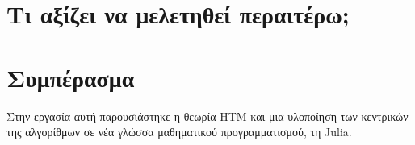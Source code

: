 
\section{Τι αξίζει να μελετηθεί περαιτέρω;} \label{conc:study-suggestions}

\section{Συμπέρασμα}

	Στην εργασία αυτή παρουσιάστηκε η θεωρία HTM και μια υλοποίηση των κεντρικών της αλγορίθμων σε νέα γλώσσα μαθηματικού προγραμματισμού, τη Julia.
	
